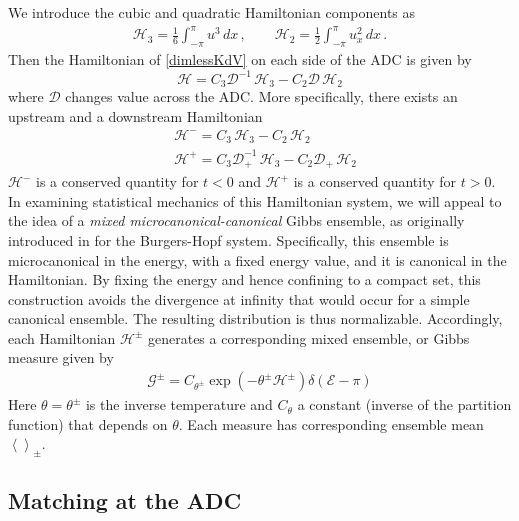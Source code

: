 \documentclass[11pt]{article}
\newcommand{\mean}[1]{\left< #1 \right>}
\newcommand{\dx}{\, dx}
\newcommand{\drat}{\mathcal{D}}
\newcommand{\dratdn}{\drat_+}
\newcommand{\En}{\mathcal{E}}
\newcommand{\Ham}{\mathcal{H}}
\newcommand{\Hthree}{\Ham_{3}}
\newcommand{\Htwo}{\Ham_{2}}
\newcommand{\Hup}{\Ham^{-}}
\newcommand{\Hdn}{\Ham^{+}}
\newcommand{\Hupdn}{\Ham^{\pm}}
\newcommand{\Gibbs}{\mathcal{G}}
\newcommand{\Gupdn}{\Gibbs^{\pm}}
\newcommand{\thupdn}{\theta^{\pm}}
\begin{document}
We introduce the cubic and quadratic Hamiltonian components as
\begin{align}
\Hthree = \frac{1}{6} \int_{-\pi}^{\pi} u^3 \dx	\, , \qquad
\Htwo = \frac{1}{2} \int_{-\pi}^{\pi} u_x^2 \dx	\, .
\end{align}
Then the Hamiltonian of \eqref{dimlessKdV} on each side of the ADC is given by
\begin{equation}
\Ham = C_3 \drat^{-1} \, \Hthree - C_2 \drat \, \Htwo
\end{equation}
where $\drat$ changes value across the ADC. More specifically, there exists an upstream and a downstream Hamiltonian
\begin{align}
&\Hup = C_3 \, \Hthree - C_2 \, \Htwo \\
&\Hdn = C_3 \dratdn^{-1} \, \Hthree - C_2 \dratdn \, \Htwo
\end{align}
$\Hup$ is a conserved quantity for $t<0$ and $\Hdn$ is a conserved quantity for $t>0$. In examining statistical mechanics of this Hamiltonian system, we will appeal to the idea of a {\em mixed microcanonical-canonical} Gibbs ensemble, as originally introduced in \cite{abramov2003hamiltonian} for the Burgers-Hopf system. Specifically, this ensemble is microcanonical in the energy, with a fixed energy value, and it is canonical in the Hamiltonian. By fixing the energy and hence confining to a compact set, this construction avoids the divergence at infinity that would occur for a simple canonical ensemble. The resulting distribution is thus normalizable.
Accordingly, each Hamiltonian $\Ham^{\pm}$ generates a corresponding mixed ensemble, or Gibbs measure given by 
\begin{align}
\Gupdn = C_{\thupdn} \exp(-\thupdn \Hupdn) \delta(\En - \pi)
\end{align}
Here $\theta = \thupdn$ is the inverse temperature and $C_{\theta}$ a constant (inverse of the partition function) that depends on $\theta$. Each measure has corresponding ensemble mean $\mean{}_{\pm}$. 


\subsection{Matching at the ADC}
\end{document}
